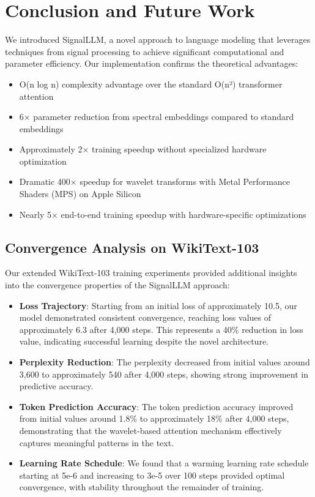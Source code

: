 \documentclass[10pt,twocolumn,letterpaper]{article}
\begin{document}
\section{Conclusion and Future Work}

We introduced SignalLLM, a novel approach to language modeling that leverages techniques from signal processing to achieve significant computational and parameter efficiency. Our implementation confirms the theoretical advantages:

\begin{itemize}
    \item O(n log n) complexity advantage over the standard O(n²) transformer attention
    \item 6× parameter reduction from spectral embeddings compared to standard embeddings
    \item Approximately 2× training speedup without specialized hardware optimization
    \item Dramatic 400× speedup for wavelet transforms with Metal Performance Shaders (MPS) on Apple Silicon
    \item Nearly 5× end-to-end training speedup with hardware-specific optimizations
\end{itemize}

\subsection{Convergence Analysis on WikiText-103}

Our extended WikiText-103 training experiments provided additional insights into the convergence properties of the SignalLLM approach:

\begin{itemize}
    \item \textbf{Loss Trajectory}: Starting from an initial loss of approximately 10.5, our model demonstrated consistent convergence, reaching loss values of approximately 6.3 after 4,000 steps. This represents a 40\% reduction in loss value, indicating successful learning despite the novel architecture.
    
    \item \textbf{Perplexity Reduction}: The perplexity decreased from initial values around 3,600 to approximately 540 after 4,000 steps, showing strong improvement in predictive accuracy.
    
    \item \textbf{Token Prediction Accuracy}: The token prediction accuracy improved from initial values around 1.8\% to approximately 18\% after 4,000 steps, demonstrating that the wavelet-based attention mechanism effectively captures meaningful patterns in the text.
    
    \item \textbf{Learning Rate Schedule}: We found that a warming learning rate schedule starting at 5e-6 and increasing to 3e-5 over 100 steps provided optimal convergence, with stability throughout the remainder of training.
\end{itemize}
\end{document}
